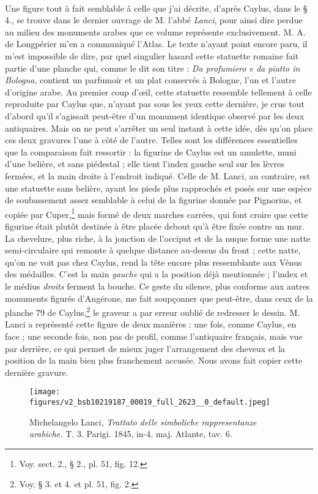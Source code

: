 \documentclass[a4paper, 11pt, oneside, polutonikogreek, french]{article}
\begin{document}
\paragraph{}
Une figure tout à fait semblable à celle que j'ai décrite, d'après Caylus, dans le § 4., se trouve dans le dernier ouvrage de M. l'abbé \emph{Lanci}, pour ainsi dire perdue au milieu des monuments arabes que ce volume représente exclusivement. M. A. de Longpérier m'en a communiqué l'Atlas. Le texte n'ayant point encore paru, il m'est impossible de dire, par quel singulier hasard cette statuette romaine fait partie d'une planche qui, comme le dit son titre : \emph{Da profumiero e da piatto in Bologna}, contient un parfumoir et un plat conservés à Bologne, l'un et l'autre d'origine arabe. Au premier coup d'œil, cette statuette ressemble tellement à celle reproduite par Caylus que, n'ayant pas sous les yeux cette dernière, je crus tout d'abord qu'il s'agissait peut-être d'un monument identique observé par les deux antiquaires. Mais on ne peut s'arrêter un seul instant à cette idée, dès qu'on place ces deux gravures l'une à côté de l'autre. Telles sont les différences essentielles que la comparaison fait ressortir : la figurine de Caylus est un amulette, muni d'une belière, et sans piédestal ; elle tient l'index gauche seul sur les lèvres fermées, et la main droite à l'endroit indiqué. Celle de M. Lanci, au contraire, est une statuette sans belière, ayant les pieds plus rapprochés et posés sur une espèce de soubassement assez semblable à celui de la figurine donnée par Pignorius, et copiée par Cuper,\footnote{Voy. sect. 2., § 2., pl. 51, fig. 12.} mais formé de deux marches carrées, qui font croire que cette figurine était plutôt destinée à être placée debout qu'à être fixée contre un mur. La chevelure, plus riche, à la jonction de l'occiput et de la nuque forme une natte semi-circulaire qui remonte à quelque distance au-dessus du front ; cette natte, qu'on ne voit pas chez Caylus, rend la tête encore plus ressemblante aux Vénus des médailles. C'est la main \emph{gauche} qui a la position déjà mentionnée ; l'index et le médius \emph{droits} ferment la bouche. Ce geste du silence, plus conforme aux autres monuments figurés d'Angérone, me fait soupçonner que peut-être, dans ceux de la planche 79 de Caylus,\footnote{Voy. § 3. et 4. et pl. 51, fig. 2.} le graveur a par erreur oublié de redresser le dessin. M. Lanci a représenté cette figure de deux manières : une fois, comme Caylus, en face ; une seconde fois, non pas de profil, comme l'antiquaire français, mais vue par derrière, ce qui permet de mieux juger l'arrangement des cheveux et la position de la main bien plus franchement accusée. Nous avons fait copier cette dernière gravure.
\clearpage
\vspace*{\fill}
\begin{figure}[H]
\centering
\texttt{[image: figures/v2\_bsb10219187\_00019\_full\_2623\_\_0\_default.jpeg]}
\caption{Michelangelo Lanci, \emph{Trattato delle simboliche rappresentanze arabiche.} T. 3. Parigi. 1845, in-4. maj. Atlante, tav. 6.}
\end{figure}
\vspace*{\fill}
\clearpage
\end{document}
